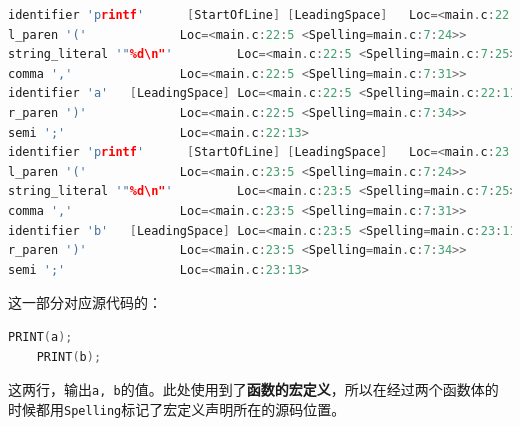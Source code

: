 \documentclass[UTF8,a4paper,10pt]{ctexart}
\begin{document}
\vspace{2em}


\begin{lstlisting}[title=词法分析片段 6,frame=trbl,language={C++}]
identifier 'printf'      [StartOfLine] [LeadingSpace]   Loc=<main.c:22:5 <Spelling=main.c:7:18>>
l_paren '('             Loc=<main.c:22:5 <Spelling=main.c:7:24>>
string_literal '"%d\n"'         Loc=<main.c:22:5 <Spelling=main.c:7:25>>
comma ','               Loc=<main.c:22:5 <Spelling=main.c:7:31>>
identifier 'a'   [LeadingSpace] Loc=<main.c:22:5 <Spelling=main.c:22:11>>
r_paren ')'             Loc=<main.c:22:5 <Spelling=main.c:7:34>>
semi ';'                Loc=<main.c:22:13>
identifier 'printf'      [StartOfLine] [LeadingSpace]   Loc=<main.c:23:5 <Spelling=main.c:7:18>>
l_paren '('             Loc=<main.c:23:5 <Spelling=main.c:7:24>>
string_literal '"%d\n"'         Loc=<main.c:23:5 <Spelling=main.c:7:25>>
comma ','               Loc=<main.c:23:5 <Spelling=main.c:7:31>>
identifier 'b'   [LeadingSpace] Loc=<main.c:23:5 <Spelling=main.c:23:11>>
r_paren ')'             Loc=<main.c:23:5 <Spelling=main.c:7:34>>
semi ';'                Loc=<main.c:23:13>
\end{lstlisting}

这一部分对应源代码的：
\begin{lstlisting}[frame=trbl,language={C++}]
    PRINT(a);
    PRINT(b);
\end{lstlisting}
这两行，输出\texttt{a, b}的值。此处使用到了\textbf{函数的宏定义}，所以在经过两个函数体的时候都用\texttt{Spelling}标记了宏定义声明所在的源码位置。

\vspace{1em}
\end{document}
